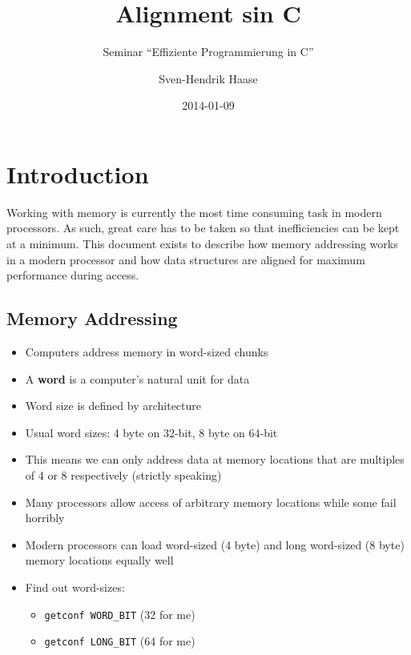 \documentclass[a4paper,12pt]{scrartcl}
\begin{document}
\begin{titlepage}
    \author{Sven-Hendrik Haase}
    \title{Alignment sin C}
    \subtitle{Seminar ``Effiziente Programmierung in C''}
    \date{2014-01-09}
    \maketitle
    \thispagestyle{empty}
\end{titlepage}

\tableofcontents

\newpage

\section{Introduction}
Working with memory is currently the most time consuming task in modern processors. As such, great
care has to be taken so that inefficiencies can be kept at a minimum. This document exists to
describe how memory addressing works in a modern processor and how data structures are aligned for
maximum performance during access.

\subsection{Memory Addressing}
\begin{itemize}
    \item Computers address memory in word-sized chunks
    \item A \textbf{word} is a computer's natural unit for data
    \item Word size is defined by architecture
    \item Usual word sizes: 4 byte on 32-bit, 8 byte on 64-bit
    \item This means we can only address data at memory locations that are
          multiples of 4 or 8 respectively (strictly speaking)
    \item Many processors allow access of arbitrary memory locations while some fail
        horribly
\end{itemize}

\begin{itemize}
    \item Modern processors can load word-sized (4 byte) and long word-sized (8 byte) memory
        locations equally well
    \item Find out word-sizes:
    \begin{itemize}
        \item \verb|getconf WORD_BIT| (32 for me)
        \item \verb|getconf LONG_BIT| (64 for me)
    \end{itemize}
\end{itemize}
\end{document}
